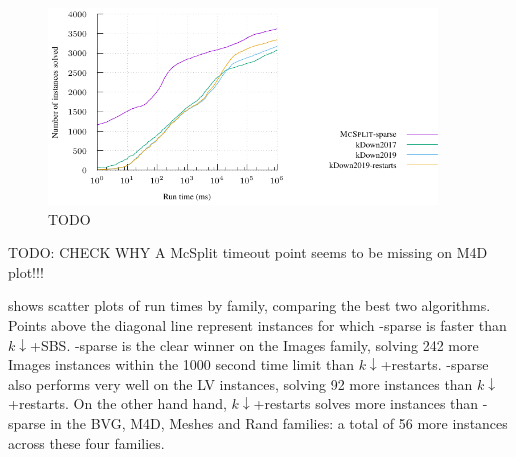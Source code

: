 \begin{figure}[htb]
    \centering
    \includegraphics*[width=0.92\textwidth]{14b-mcsplit-induced-si/sip-instances-mcis-experiment/experiment/plots/cumulative.pdf}
    \caption{TODO}
    \label{figure:mcsplit-sparse-cumulative}
\end{figure}

TODO: CHECK WHY A McSplit timeout point seems to be missing on M4D plot!!!

 shows scatter plots
of run times by family, comparing the best two algorithms.  Points
above the diagonal line represent instances for which \McSplit-sparse
is faster than $k\downarrow$+SBS. 
\McSplit-sparse is the clear winner on the Images family,
solving 242 more Images instances
within the 1000 second time limit than $k\downarrow$+restarts.
\McSplit-sparse also performs very well on the LV instances,
solving 92 more instances than $k\downarrow$+restarts.
On the other hand
hand, $k\downarrow$+restarts solves more instances than \McSplit-sparse in the
BVG, M4D, Meshes and Rand families: a total of 56 more instances across these
four families.

